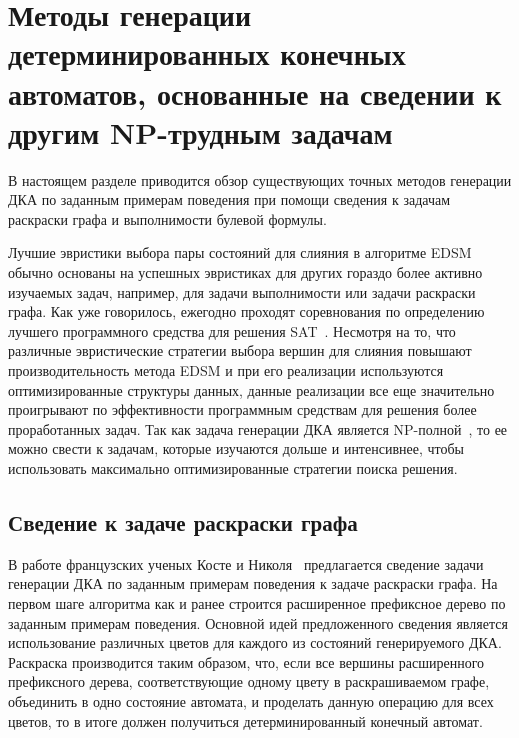 


\section{Методы генерации детерминированных конечных автоматов, основанные на сведении к другим NP-трудным задачам} 
\label{sec:review:sat-dfa-inf} 

В настоящем разделе приводится обзор существующих точных методов генерации ДКА по заданным примерам поведения при помощи сведения к задачам раскраски графа и выполнимости булевой формулы.

Лучшие эвристики выбора пары состояний для слияния в алгоритме EDSM обычно основаны на успешных эвристиках для других гораздо более активно изучаемых задач, например, для задачи выполнимости или задачи раскраски графа.
Как уже говорилось, ежегодно проходят соревнования по определению лучшего программного средства для решения SAT~\cite{sat-competitions}.
Несмотря на то, что различные эвристические стратегии выбора вершин для слияния повышают производительность метода EDSM и при его реализации используются оптимизированные структуры данных, данные реализации все еще значительно проигрывают по эффективности программным средствам для решения более проработанных задач.
Так как задача генерации ДКА является NP-полной~\cite{DBLP:journals/iandc/Gold78}, то ее можно свести к задачам, которые изучаются дольше и интенсивнее, чтобы использовать максимально оптимизированные стратегии поиска решения.

\subsection{Сведение к задаче раскраски графа}
\label{sec:review:sat-dfa-inf:coloring}

В работе французских ученых Косте и Николя~\cite{Coste97regularinference} предлагается сведение задачи генерации ДКА по заданным примерам поведения к задаче раскраски графа.
На первом шаге алгоритма как и ранее строится расширенное префиксное дерево по заданным примерам поведения.
Основной идей предложенного сведения является использование различных цветов для каждого из состояний генерируемого ДКА.
Раскраска производится таким образом, что, если все вершины расширенного префиксного дерева, соответствующие одному цвету в раскрашиваемом графе, объединить в одно состояние автомата, и проделать данную операцию для всех цветов, то в итоге должен получиться детерминированный конечный автомат. 

